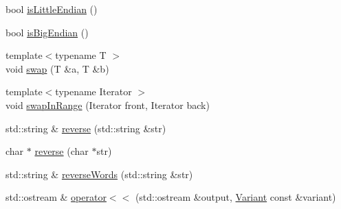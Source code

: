 \begin{DoxyCompactItemize}
bool \hyperlink{namespacesandbox_a563b930dc7888d8ab257fe747fa53487}{is\-Little\-Endian} ()
\item 
bool \hyperlink{namespacesandbox_a550f00cb3d4e2ac434c7b76532e79573}{is\-Big\-Endian} ()
\item 
{\footnotesize template$<$typename T $>$ }\\void \hyperlink{namespacesandbox_a78a289ddc885bdcb5383f1363c54db2c}{swap} (T \&a, T \&b)
\item 
{\footnotesize template$<$typename Iterator $>$ }\\void \hyperlink{namespacesandbox_af7dc9a62c4e56b2b4c4a12ff6e82a237}{swap\-In\-Range} (Iterator front, Iterator back)
\item 
std\-::string \& \hyperlink{namespacesandbox_acb1d210d07ad7665578cbcb47c995332}{reverse} (std\-::string \&str)
\item 
char $\ast$ \hyperlink{namespacesandbox_a71d57df2b65e2db22f1b6126cf5305ec}{reverse} (char $\ast$str)
\item 
std\-::string \& \hyperlink{namespacesandbox_aa4f703c0251f20815a2f7d99bf55b9a8}{reverse\-Words} (std\-::string \&str)
\item 
std\-::ostream \& \hyperlink{namespacesandbox_a1d6485022eb73d061719402a29c67183}{operator$<$$<$} (std\-::ostream \&output, \hyperlink{classsandbox_1_1_variant}{Variant} const \&variant)
\end{DoxyCompactItemize}



